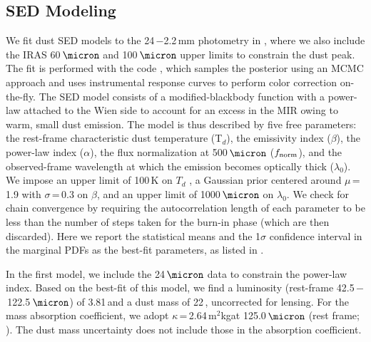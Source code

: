 \documentclass[]{emulateapj}
\begin{document}
\subsection{SED Modeling} \label{sec:SED}  %
We fit dust SED models to the
24\,\micron$-$2.2\,mm photometry in , where we also
include the IRAS 60\,$\micron$ and 100\,$\micron$ upper limits
to constrain the dust peak.
The fit is performed with the code
 \citep[\eg][]{Riechers13a,Dowell14a}, which samples the posterior
using an MCMC approach and uses instrumental
response curves to perform color correction on-the-fly.
The SED model consists of a modified-blackbody
function with a power-law attached to the
Wien side to account for an excess in the MIR owing to warm,
small dust emission.
%
The model is thus described by five free parameters: the rest-frame characteristic dust
temperature (T$_{d}$), the emissivity index ($\beta$), the power-law index
($\alpha$), the flux normalization at 500\,$\micron$ ($f_{\rm norm}$), and
the observed-frame wavelength at which the emission
becomes optically thick ($\lambda_{0}$). We impose
an upper limit of 100\,K on $T_d$ \citep[see \eg][]{Sajina12a},
a Gaussian prior centered around
$\mu$\,=\,1.9 with $\sigma$\,=\,0.3 on $\beta$, and an upper limit of
1000\,$\micron$ on $\lambda_0$.
We check for chain convergence by requiring the autocorrelation
length of each parameter to be less than the number of steps
taken for the burn-in phase (which are then discarded).
Here we report the statistical means %
and the 1$\sigma$ confidence interval in the marginal PDFs
as the best-fit parameters, as listed in .



In the first model, we include the 24\,$\micron$ data
to constrain the power-law index. Based on the
best-fit of this model, we find a
\fir luminosity (rest-frame 42.5\,$-$\,122.5\,$\micron$) of
3.81\,\Lsun and a
dust mass of 22\,\Msun, uncorrected for lensing.
For the mass absorption coefficient, we adopt
$\kappa$\,=\,2.64\,m$^2$kg\pmOne at 125.0\,$\micron$
(rest frame; \citealt{Dunne03a}).
The dust mass uncertainty does not
include those in the absorption coefficient.
\end{document}
